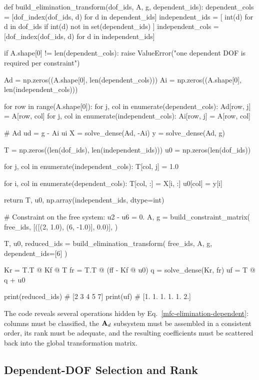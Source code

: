 \begin{python}
def build_elimination_transform(dof_ids, A, g, dependent_ids):
    dependent_cols = [dof_index(dof_ids, d) for d in dependent_ids]
    independent_ids = [
        int(d) for d in dof_ids if int(d) not in set(dependent_ids)
    ]
    independent_cols = [dof_index(dof_ids, d) for d in independent_ids]

    if A.shape[0] != len(dependent_cols):
        raise ValueError("one dependent DOF is required per constraint")

    Ad = np.zeros((A.shape[0], len(dependent_cols)))
    Ai = np.zeros((A.shape[0], len(independent_cols)))

    for row in range(A.shape[0]):
        for j, col in enumerate(dependent_cols):
            Ad[row, j] = A[row, col]
        for j, col in enumerate(independent_cols):
            Ai[row, j] = A[row, col]

    # Ad ud = g - Ai ui
    X = solve_dense(Ad, -Ai)
    y = solve_dense(Ad, g)

    T = np.zeros((len(dof_ids), len(independent_ids)))
    u0 = np.zeros(len(dof_ids))

    for j, col in enumerate(independent_cols):
        T[col, j] = 1.0

    for i, col in enumerate(dependent_cols):
        T[col, :] = X[i, :]
        u0[col] = y[i]

    return T, u0, np.array(independent_ids, dtype=int)


# Constraint on the free system: u2 - u6 = 0.
A, g = build_constraint_matrix(
    free_ids,
    [([(2, 1.0), (6, -1.0)], 0.0)],
)

T, u0, reduced_ids = build_elimination_transform(
    free_ids, A, g, dependent_ids=[6]
)

Kr = T.T @ Kf @ T
fr = T.T @ (ff - Kf @ u0)
q = solve_dense(Kr, fr)
uf = T @ q + u0

print(reduced_ids)   # [2 3 4 5 7]
print(uf)            # [1. 1. 1. 1. 1. 2.]
\end{python}

The code reveals several operations hidden by Eq.~\eqref{mfc-elimination-dependent}:
columns must be classified, the $\mathbf{A}_d$ subsystem must be assembled in a
consistent order, its rank must be adequate, and the resulting coefficients must
be scattered back into the global transformation matrix.

\subsection{Dependent-DOF Selection and Rank}

